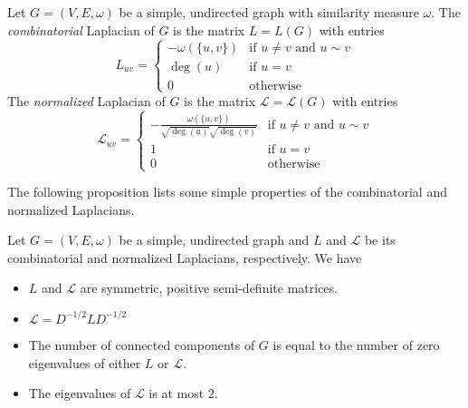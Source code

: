 \begin{definition}
  \label{def:1}
  Let $G = (V,E,\omega)$ be a simple, undirected graph with similarity
  measure $\omega$. The {\em combinatorial} Laplacian of $G$ is the
  matrix $L = L(G)$ with entries
  \begin{equation}
    \label{eq:1}
    L_{uv} = \begin{cases}
      - \omega(\{u,v\}) & \text{if $u \not = v$ and $u \sim v$} \\
      \deg(u) & \text{if $u = v$} \\
      0 & \text{otherwise}
    \end{cases}
  \end{equation}
  The {\em normalized} Laplacian of $G$ is the matrix $\mathcal{L} =
  \mathcal{L}(G)$ with entries
  \begin{equation}
    \label{eq:2}
    \mathcal{L}_{uv} = \begin{cases}
      - \tfrac{\omega(\{u,v\})}{\sqrt{\deg(u)}\sqrt{\deg(v)}} & \text{if $u \not = v$ and $u \sim v$} \\
      1 & \text{if $u = v$} \\
      0 & \text{otherwise}
    \end{cases}
  \end{equation}
\end{definition}
The following proposition lists some simple properties of the
combinatorial and normalized Laplacians. 
\begin{proposition}
  \label{prop:1}
  Let $G = (V,E,\omega)$ be a simple, undirected graph and $L$ and
  $\mathcal{L}$ be its combinatorial and normalized Laplacians,
  respectively. We have
  \begin{itemize}
  \item $L$ and $\mathcal{L}$ are symmetric, positive
    semi-definite matrices.
  \item $\mathcal{L} = D^{-1/2} L D^{-1/2}$
  \item The number of connected components of $G$ is equal to the
    number of zero eigenvalues of either $L$ or $\mathcal{L}$.
  \item The eigenvalues of $\mathcal{L}$ is at most $2$. 
  \end{itemize}
\end{proposition}
